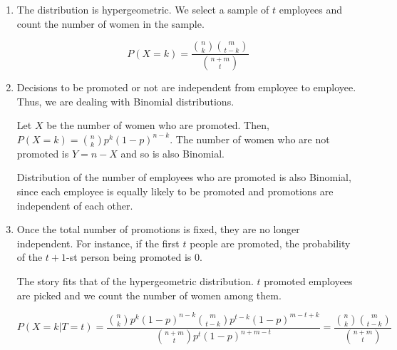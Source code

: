 \begin{enumerate}[label=(\alph*)]
\item The distribution is hypergeometric. We select a sample of $t$ employees
and count the number of women in the sample.

$$P(X = k) = \frac{\binom{n}{k}\binom{m}{t-k}}{\binom{n+m}{t}}$$

\item Decisions to be promoted or not are independent from employee to employee.
Thus, we are dealing with Binomial distributions.

Let $X$ be the number of women who are promoted. Then, $P(X=k) = \binom{n}{k}p^
{k}(1-p)^{n-k}$. The number of women who are not promoted is $Y=n-X$ and so is
also Binomial.

Distribution of the number of employees who are promoted is also Binomial, since
each employee is equally likely to be promoted and promotions are independent of
each other.

\item Once the total number of promotions is fixed, they are no longer
independent. For instance, if the first $t$ people are promoted, the
probability of the $t+1$-st person being promoted is $0$.

The story fits that of the hypergeometric distribution. $t$ promoted
employees
are picked and we count the number of women among them.

$$P(X = k | T = t) = \frac{\binom{n}{k}p^
{k}(1-p)^{n-k}\binom{m}{t-k}p^
{t-k}(1-p)^{m-t+k}}{\binom{n+m}{t}p^{t}(1-p)^{n+m-t}} = \frac{\binom{n}{k}
\binom{m}{t-k}}{\binom{n+m}{t}}$$
\end{enumerate}